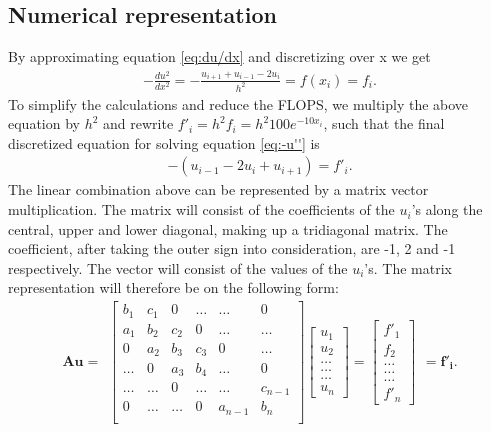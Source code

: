 \documentclass{emulateapj}
\begin{document}
\subsection{Numerical representation}
By approximating equation \eqref{eq:du/dx} and discretizing over x we get
%
\begin{gather*}
    -\frac{du^2}{dx^2} = -\frac{u_{i+1} + u_{i-1} - 2u_i}{h^2} = f(x_i) = f_i.
\end{gather*}
%
To simplify the calculations and reduce the FLOPS, we multiply the above equation by $h^2$ and rewrite $f'_i = h^2f_i = h^2 100 e^{-10x_i}$, such that the final discretized equation for solving equation \eqref{eq:-u''} is
%
\begin{gather}\label{eq:u_discretized}
    -\left(u_{i-1} - 2u_i + u_{i+1}\right) = f'_i.
\end{gather}
%
The linear combination above can be represented by a matrix vector multiplication. The matrix will consist of the coefficients of the $u_i$'s along the central, upper and lower diagonal, making up a tridiagonal matrix. The coefficient, after taking the outer sign into  consideration, are -1, 2 and -1 respectively. The vector will consist of the values of the $u_i$'s. The matrix representation will therefore be on the following form:
%
\[ \boldsymbol{Au} =
\begin{array}{c}
\begin{bmatrix}\label{eq:Au=f}
b_1     & c_1           & 0         & \dots     & \dots     & 0 \\
a_1     & b_2           & c_2       & 0         & \dots     & \dots \\
0       & a_2           & b_3       & c_3       & 0     & \dots\\
\dots  &  0            & a_3       & b_4       & \dots    & 0 \\
\dots  & \dots        & 0 & \dots    & \dots    & c_{n-1} \\
0       & \dots         & \dots         & 0         & a_{n-1}   & b_n   \\
\end{bmatrix}
\begin{bmatrix}
u_1 \\
u_2 \\
\dots \\
\dots \\
\dots \\
u_n
\end{bmatrix}
=
\begin{bmatrix}
f'_1 \\
f_2 \\
\dots \\
\dots \\
\dots \\
f'_n
\end{bmatrix}
\end{array}
= \boldsymbol{f'_i}.
\]
\end{document}
